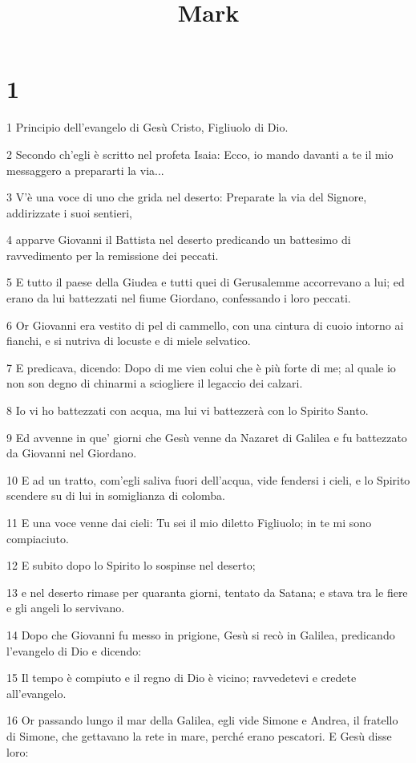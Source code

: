

\title{Mark}


\chapter{1}

\par 1 Principio dell'evangelo di Gesù Cristo, Figliuolo di Dio.
\par 2 Secondo ch'egli è scritto nel profeta Isaia: Ecco, io mando davanti a te il mio messaggero a prepararti la via...
\par 3 V'è una voce di uno che grida nel deserto: Preparate la via del Signore, addirizzate i suoi sentieri,
\par 4 apparve Giovanni il Battista nel deserto predicando un battesimo di ravvedimento per la remissione dei peccati.
\par 5 E tutto il paese della Giudea e tutti quei di Gerusalemme accorrevano a lui; ed erano da lui battezzati nel fiume Giordano, confessando i loro peccati.
\par 6 Or Giovanni era vestito di pel di cammello, con una cintura di cuoio intorno ai fianchi, e si nutriva di locuste e di miele selvatico.
\par 7 E predicava, dicendo: Dopo di me vien colui che è più forte di me; al quale io non son degno di chinarmi a sciogliere il legaccio dei calzari.
\par 8 Io vi ho battezzati con acqua, ma lui vi battezzerà con lo Spirito Santo.
\par 9 Ed avvenne in que' giorni che Gesù venne da Nazaret di Galilea e fu battezzato da Giovanni nel Giordano.
\par 10 E ad un tratto, com'egli saliva fuori dell'acqua, vide fendersi i cieli, e lo Spirito scendere su di lui in somiglianza di colomba.
\par 11 E una voce venne dai cieli: Tu sei il mio diletto Figliuolo; in te mi sono compiaciuto.
\par 12 E subito dopo lo Spirito lo sospinse nel deserto;
\par 13 e nel deserto rimase per quaranta giorni, tentato da Satana; e stava tra le fiere e gli angeli lo servivano.
\par 14 Dopo che Giovanni fu messo in prigione, Gesù si recò in Galilea, predicando l'evangelo di Dio e dicendo:
\par 15 Il tempo è compiuto e il regno di Dio è vicino; ravvedetevi e credete all'evangelo.
\par 16 Or passando lungo il mar della Galilea, egli vide Simone e Andrea, il fratello di Simone, che gettavano la rete in mare, perché erano pescatori. E Gesù disse loro:
